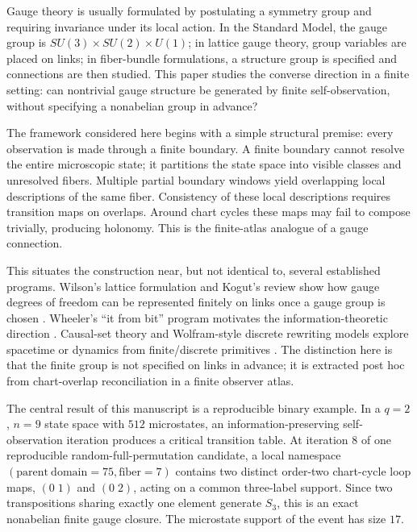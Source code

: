 \documentclass[11pt]{article}
\begin{document}
Gauge theory is usually formulated by postulating a symmetry group and requiring invariance under its local action.  In the Standard Model, the gauge group is $SU(3)\times SU(2)\times U(1)$; in lattice gauge theory, group variables are placed on links; in fiber-bundle formulations, a structure group is specified and connections are then studied.  This paper studies the converse direction in a finite setting: can nontrivial gauge structure be generated by finite self-observation, without specifying a nonabelian group in advance?

The framework considered here begins with a simple structural premise: every observation is made through a finite boundary.  A finite boundary cannot resolve the entire microscopic state; it partitions the state space into visible classes and unresolved fibers.  Multiple partial boundary windows yield overlapping local descriptions of the same fiber.  Consistency of these local descriptions requires transition maps on overlaps.  Around chart cycles these maps may fail to compose trivially, producing holonomy.  This is the finite-atlas analogue of a gauge connection.

This situates the construction near, but not identical to, several established programs.  Wilson's lattice formulation and Kogut's review show how gauge degrees of freedom can be represented finitely on links once a gauge group is chosen \cite{wilson1974,kogut1979}.  Wheeler's ``it from bit'' program motivates the information-theoretic direction \cite{wheeler1990}.  Causal-set theory and Wolfram-style discrete rewriting models explore spacetime or dynamics from finite/discrete primitives \cite{sorkin2003,wolfram2020}.  The distinction here is that the finite group is not specified on links in advance; it is extracted post hoc from chart-overlap reconciliation in a finite observer atlas.

The central result of this manuscript is a reproducible binary example.  In a $q=2$, $n=9$ state space with $512$ microstates, an information-preserving self-observation iteration produces a critical transition table.  At iteration $8$ of one reproducible random-full-permutation candidate, a local namespace $(\mathrm{parent\ domain}=75,\mathrm{fiber}=7)$ contains two distinct order-two chart-cycle loop maps, $(0\;1)$ and $(0\;2)$, acting on a common three-label support.  Since two transpositions sharing exactly one element generate $S_3$, this is an exact nonabelian finite gauge closure.  The microstate support of the event has size $17$.
\end{document}
